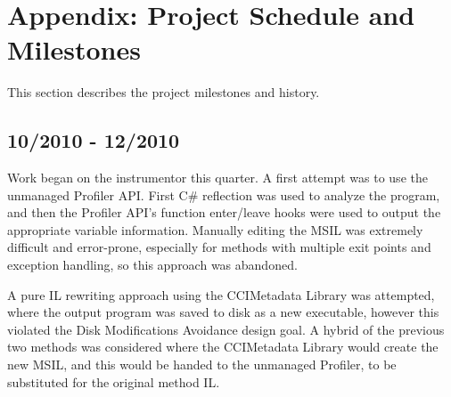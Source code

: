 \documentclass{article}
\begin{document}



\appendix

\section{Appendix: Project Schedule and Milestones}
This section describes the project milestones and history.

\subsection{10/2010 - 12/2010}
Work began on the instrumentor this quarter. A first attempt was to use the unmanaged Profiler API. First C\# reflection was used to analyze the program, and then the Profiler API's function enter/leave hooks were used to output the appropriate variable information. Manually editing the MSIL was extremely difficult and error-prone, especially for methods with multiple exit points and exception handling, so this approach was abandoned.

A pure IL rewriting approach using the CCIMetadata Library was attempted, where the output program was saved to disk as a new executable, however this violated the Disk Modifications Avoidance design goal. A hybrid of the previous two methods was considered where the CCIMetadata Library would create the new MSIL, and this would be handed to the unmanaged Profiler, to be substituted for the original method IL.
\end{document}
